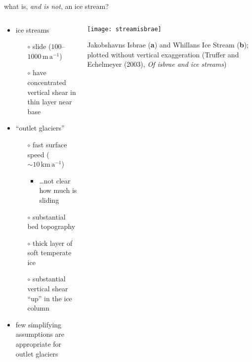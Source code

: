 \begin{frame}{what is, \emph{and is not}, an ice stream?}

\begin{columns}
\begin{column}{0.6\textwidth}
\begin{itemize}
\item ice streams
  \small
  \begin{itemize}
  \item[$\circ$] slide ($100$--$1000 \,\text{m}\,\text{a}^{-1}$)
  \item[$\circ$] have concentrated vertical shear in thin layer near base
  \end{itemize}
  \normalsize
\item ``outlet glaciers''
  \begin{itemize}
  \item[$\circ$] fast surface speed ($\sim10 \,\text{km}\,\text{a}^{-1}$)
    \begin{itemize}
    \item \dots not clear how much is sliding
    \end{itemize}    
  \item[$\circ$] substantial bed topography
  \item[$\circ$] thick layer of soft temperate ice
  \item[$\circ$] substantial vertical shear ``up'' in the ice column
  \end{itemize}
\item \alert{few simplifying assumptions are appropriate for outlet glaciers}
\end{itemize}
\end{column}

\begin{column}{0.4\textwidth}
\texttt{[image: streamisbrae]}

\bigskip
\scriptsize
Jakobshavns Isbrae (\textbf{a}) and Whillans Ice Stream (\textbf{b}); plotted without vertical exaggeration (\tiny Truffer and Echelmeyer (2003), \emph{Of isbrae and ice streams}\scriptsize)
\end{column}
\end{columns}
\end{frame}


